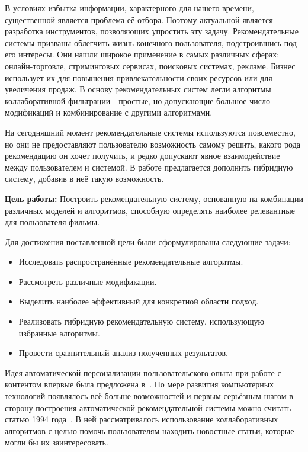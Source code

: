 \documentclass[a4paper,article,14pt]{extarticle}
\begin{document}


\tableofcontents

\pagebreak
{}

В условиях избытка информации, характерного для нашего времени, существенной является проблема её отбора.
Поэтому актуальной является разработка инструментов, позволяющих упростить эту задачу.
Рекомендательные системы призваны облегчить жизнь конечного пользователя, подстроившись под его интересы.
Они нашли широкое применение в самых различных сферах: онлайн-торговле, стриминговых сервисах, поисковых системах, рекламе.
Бизнес использует их для повышения привлекательности своих ресурсов или для увеличения продаж.
В основу рекомендательных систем легли алгоритмы коллаборативной фильтрации - простые, но допускающие большое число модификаций и комбинирование с другими алгоритмами.

На сегодняшний момент рекомендательные системы используются повсеместно, но они не предоставляют пользователю возможность самому решить, какого рода рекомендацию он хочет получить, и редко допускают явное взаимодействие между пользователем и системой.
В работе предлагается дополнить гибридную систему, добавив в неё такую возможность.

\pagebreak
{}
\textbf{Цель работы:} Построить рекомендательную систему, основанную на комбинации различных моделей и алгоритмов, способную определять наиболее релевантные для пользователя фильмы.

Для достижения поставленной цели были сформулированы следующие задачи:
\begin{itemize}
\item Исследовать распространённые рекомендательные алгоритмы.
\item Рассмотреть различные модификации.
\item Выделить наиболее эффективный для конкретной области подход.
\item Реализовать гибридную рекомендательную систему, использующую избранные алгоритмы.
\item Провести сравнительный анализ полученных результатов.
\end{itemize}

\pagebreak
{}
Идея автоматической персонализации пользовательского опыта при работе с контентом впервые была предложена в~\cite{rich}.
По мере развития компьютерных технологий появлялось всё больше возможностей и первым серьёзным шагом в сторону построения автоматической рекомендательной системы можно считать статью 1994 года~\cite{resnick}.
В ней рассматривалось использование коллаборативных алгоритмов с целью помочь пользователям находить новостные статьи, которые могли бы их заинтересовать.
\end{document}
